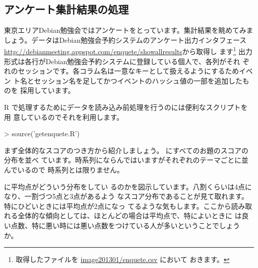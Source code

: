\documentclass[mingoth,a4paper]{jsarticle}
\begin{document}
\subsection{アンケート集計結果の処理}

東京エリアDebian勉強会ではアンケートをとっています。集計結果を眺めてみま
しょう。データはDebian勉強会予約システムのアンケート出力インタフェース
\url{http://debianmeeting.appspot.com/enquete/showallresults}から取得し
ます\footnote{取得したファイルを \url{image201301/enquete.csv} において
おきます。}
出力形式は各行がDebian勉強会予約システムに登録している個人で、各列がそれ
ぞれのセッションです。各コラム名は一意なキーとして扱えるようにするためイベン
ト名とセッション名を足してかつイベントのハッシュ値の一部を追加したものを
採用しています。

R で処理するためにデータを読み込み前処理を行うのには便利なスクリプトを用
意しているのでそれを利用します。

\begin{commandline}
> source('getenquete.R')
\end{commandline}

まず全体的なスコアのつき方から紹介しましょう。
にすべてのお題のスコアの分布を並べ
ています。時系列にならんではいますがそれぞれのテーマごとに並んでいるので
時系列とは限りません。

に平均点がどういう分布をしてい
るのかを図示しています。八割くらいは4点になり、一割づつ5点と3点があるよう
なスコア分布であることが見て取れます。特にひどいときには平均点が2点になっ
てるような気もします。ここから読み取れる全体的な傾向としては、ほとんどの場合は平均点で、特によいときに
は良い点数、特に悪い時には悪い点数をつけている人が多いということでしょう
か。
\end{document}
